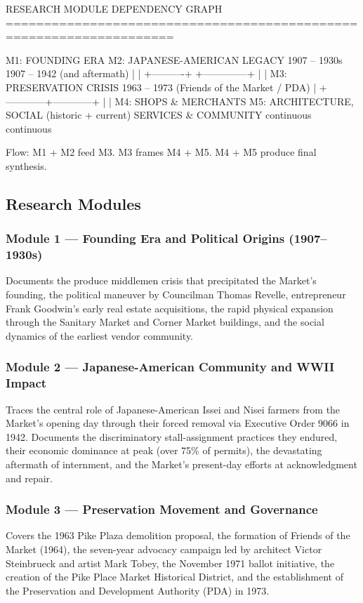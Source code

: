\documentclass[11pt,letterpaper]{article}
\begin{document}
\begin{asciibox}
RESEARCH MODULE DEPENDENCY GRAPH
====================================================================

  M1: FOUNDING ERA            M2: JAPANESE-AMERICAN LEGACY
  1907 -- 1930s               1907 -- 1942 (and aftermath)
       |                              |
       +----------+   +--------------+
                  |   |
              M3: PRESERVATION CRISIS
              1963 -- 1973 (Friends of the Market / PDA)
                       |
          +------------+------------+
          |                         |
  M4: SHOPS & MERCHANTS     M5: ARCHITECTURE, SOCIAL
  (historic + current)      SERVICES & COMMUNITY
  continuous                continuous

  Flow: M1 + M2 feed M3. M3 frames M4 + M5. M4 + M5 produce final synthesis.
\end{asciibox}

\subsection{Research Modules}

\subsubsection{Module 1 --- Founding Era and Political Origins (1907--1930s)}
Documents the produce middlemen crisis that precipitated the Market's founding, the political maneuver by Councilman Thomas Revelle, entrepreneur Frank Goodwin's early real estate acquisitions, the rapid physical expansion through the Sanitary Market and Corner Market buildings, and the social dynamics of the earliest vendor community.

\subsubsection{Module 2 --- Japanese-American Community and WWII Impact}
Traces the central role of Japanese-American Issei and Nisei farmers from the Market's opening day through their forced removal via Executive Order 9066 in 1942. Documents the discriminatory stall-assignment practices they endured, their economic dominance at peak (over 75\% of permits), the devastating aftermath of internment, and the Market's present-day efforts at acknowledgment and repair.

\subsubsection{Module 3 --- Preservation Movement and Governance}
Covers the 1963 Pike Plaza demolition proposal, the formation of Friends of the Market (1964), the seven-year advocacy campaign led by architect Victor Steinbrueck and artist Mark Tobey, the November 1971 ballot initiative, the creation of the Pike Place Market Historical District, and the establishment of the Preservation and Development Authority (PDA) in 1973.
\end{document}
